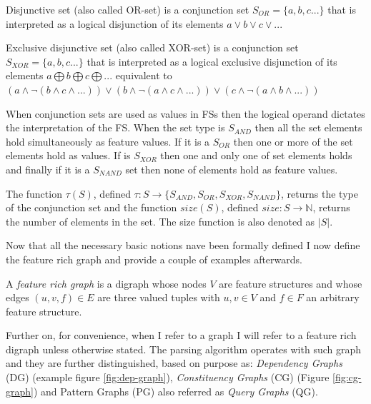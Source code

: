 \begin{definition}\label{def:or-set}
	Disjunctive set (also called OR-set) is a conjunction set $S_{OR}=\{a,b,c...\}$ that is interpreted as a logical disjunction of its elements $a \vee b \vee c \vee ...$
\end{definition}

\begin{definition}\label{def:xor-set}
	Exclusive disjunctive set (also called XOR-set) is a conjunction set $S_{XOR}=\{a,b,c...\}$ that is interpreted as a logical exclusive disjunction of its elements $a \bigoplus b \bigoplus c \bigoplus ...$ equivalent to $ (a \wedge \neg (b \wedge c \wedge ... )) \vee (b \wedge \neg (a \wedge c \wedge ...)) \vee (c \wedge \neg (a \wedge b \wedge ...)) $
\end{definition}

When conjunction sets are used as values in FSs then the logical operand dictates the interpretation of the FS. When the set type is $S_{AND}$ then all the set elements hold simultaneously as feature values. If it is a $S_{OR}$ then one or more of the set elements hold as values. If is $S_{XOR}$ then one and only one of set elements holds and finally if it is a $S_{NAND}$ set then none of elements hold as feature values.

The function $\tau(S)$, defined $\tau:S \rightarrow \{S_{AND},S_{OR},S_{XOR},S_{NAND} \}$, returns the type of the conjunction set and the function $size(S)$, defined $size:S \rightarrow \mathbb{N}$, returns the number of elements in the set. The size function is also denoted as $|S|$.
 
Now that all the necessary basic notions nave been formally defined I now define the feature rich graph and provide a couple of examples afterwards. 
 
\begin{definition}\label{def:feature-rich-graph}
	A \textit{feature rich graph} is a digraph whose nodes $V$ are feature structures and whose edges $(u,v,f) \in E$ are three valued tuples with $ u,v \in V$ and $f \in F$ an arbitrary feature structure.
\end{definition}

Further on, for convenience, when I refer to a graph I will refer to a feature rich digraph unless otherwise stated. The parsing algorithm operates with such graph and they are further distinguished, based on purpose as: \textit{Dependency Graphs} (DG) (example figure \ref{fig:dep-graph}), \textit{Constituency Graphs} (CG) (Figure \ref{fig:cg-graph}) and Pattern Graphs (PG) also referred as \textit{Query Graphs} (QG).

